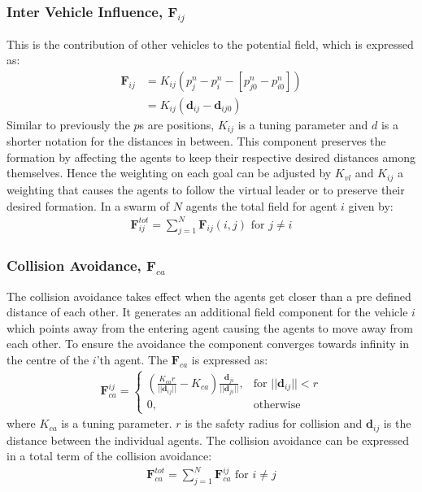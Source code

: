 \subsubsection{Inter Vehicle Influence, $\mathbf{F}_{ij}$}
This is the contribution of other vehicles to the potential field,
which is expressed as:
\begin{align}
\mathbf{F}_{ij} &= K_{ij}(p_{j}^n-p_i^n-[p_{j0}^n-p_{i0}^n])\\
&= K_{ij}(\mathbf{d}_{ij}-\mathbf{d}_{ij0})
\end{align}
Similar to previously the $p$s are positions, $K_{ij}$ is a tuning
parameter and $d$ is a shorter notation for the distances in between.
This component preserves the formation by affecting the agents to keep
their respective desired distances among themselves. Hence the
weighting on each goal can be adjusted by $K_{vl}$ and $K_{ij}$ a
weighting that causes the agents to follow the virtual leader or to
preserve their desired formation.  In a swarm of $N$ agents the total
field for agent $i$ given by:
\begin{align}
\mathbf{F}_{ij}^{tot} = \sum\limits_{j=1}^N\mathbf{F}_{ij}(i,j) \text{ for } j\neq i
\end{align}

\subsubsection{Collision Avoidance, $\mathbf{F}_{ca}$}
The collision avoidance takes effect when the agents get closer than a
pre defined distance of each other. It generates an additional field
component for the vehicle $i$ which points away from the entering
agent causing the agents to move away from each other. To ensure the
avoidance the component converges towards infinity in the centre of
the $i$'th agent. The $\mathbf{F}_{ca}$ is expressed as:
\begin{align}
    \mathbf{F}_{ca}^{ij}= 
\begin{cases}
		\left(
    \frac{K_{ca}r}{||\mathbf{d}_{ij}||}-K_{ca}
		\right)
		\frac{\mathbf{d}_{ji}}{||\mathbf{d}_{ji}||}
		,& \text{for } ||\mathbf{d}_{ij}||<r\\
    0,              & \text{otherwise}
\end{cases}
\end{align}
where $K_{ca}$ is a tuning parameter. $r$ is the safety radius for
collision and $\mathbf{d}_{ij}$ is the distance between the individual agents.
The collision avoidance can be expressed in a total term of the
collision avoidance:
\begin{align}
\mathbf{F}_{ca}^{tot} = \sum\limits_{j=1}^N\mathbf{F}_{ca}^{ij} \text{ for } i\neq j
\end{align}

